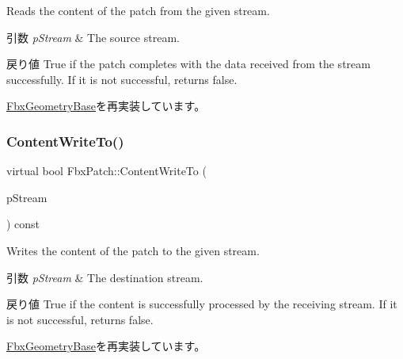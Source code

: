 Reads the content of the patch from the given stream. 
\begin{DoxyParams}{引数}
{\em p\+Stream} & The source stream. \\
\hline
\end{DoxyParams}
\begin{DoxyReturn}{戻り値}
{\ttfamily True} if the patch completes with the data received from the stream successfully. If it is not successful, returns {\ttfamily false}. 
\end{DoxyReturn}


\hyperlink{class_fbx_geometry_base_a6d34ab23d253b07cac24267177096c1a}{Fbx\+Geometry\+Base}を再実装しています。

\mbox{\label{class_fbx_patch_a2ecc16ad355ca521c921ec3731719585}} 
\subsubsection{\texorpdfstring{Content\+Write\+To()}{ContentWriteTo()}}
{\footnotesize\ttfamily virtual bool Fbx\+Patch\+::\+Content\+Write\+To (\begin{DoxyParamCaption}\item[{\hyperlink{class_fbx_stream}{Fbx\+Stream} \&}]{p\+Stream }\end{DoxyParamCaption}) const\hspace{0.3cm}{\ttfamily [virtual]}}

Writes the content of the patch to the given stream. 
\begin{DoxyParams}{引数}
{\em p\+Stream} & The destination stream. \\
\hline
\end{DoxyParams}
\begin{DoxyReturn}{戻り値}
{\ttfamily True} if the content is successfully processed by the receiving stream. If it is not successful, returns {\ttfamily false}. 
\end{DoxyReturn}


\hyperlink{class_fbx_geometry_base_a7b80ccbcd2b15bbedbe7dd7e0739a3b3}{Fbx\+Geometry\+Base}を再実装しています。

\mbox{\label{class_fbx_patch_a424542a42ec75d3c5236cc366adecd89}} 
